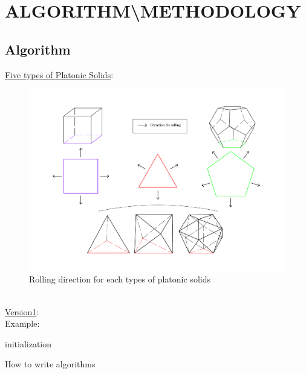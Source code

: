 \section{ALGORITHM\textbackslash METHODOLOGY}

\subsection{Algorithm}
\noindent\uline{Five types of Platonic Solids}: 
\begin{figure}[h]
\centering
	\includegraphics[width=1\textwidth]{image/rollingDir2.pdf}
	\caption{Rolling direction for each types of platonic solids}
	\label{fig:platonicSolids}
\end{figure}\\
%
% 
%
%
%
%
%
\uline{Version1}: \\


Example:\\
\begin{algorithm}[H]
\SetAlgoLined
{}
 initialization\;
 \caption{How to write algorithms}
\end{algorithm}


